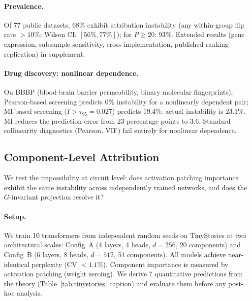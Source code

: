 \documentclass{article}
\begin{document}
\paragraph{Prevalence.}
Of 77 public datasets, 68\% exhibit attribution instability (any within-group flip rate $> 10\%$; Wilson CI: $[56\%, 77\%]$); for $P \geq 20$: 93\%. Extended results (gene expression, subsample sensitivity, cross-implementation, published ranking replication) in supplement.

\paragraph{Drug discovery: nonlinear dependence.}
On BBBP (blood-brain barrier permeability, binary molecular fingerprints), Pearson-based screening predicts $0\%$ instability for a nonlinearly dependent pair; MI-based screening ($I > \tau_{95} = 0.027$) predicts $19.4\%$; actual instability is $23.1\%$. MI reduces the prediction error from 23 percentage points to 3.6. Standard collinearity diagnostics (Pearson, VIF) fail entirely for nonlinear dependence.

\subsection{Component-Level Attribution}
\label{sec:component-experiments}

We test the impossibility at circuit level: does activation patching importance exhibit the same instability across independently trained networks, and does the $G$-invariant projection resolve it?

\paragraph{Setup.}
We train 10 transformers from independent random seeds on TinyStories \citep{eldan2023tinystories} at two architectural scales: Config~A (4 layers, 4 heads, $d{=}256$, 20 components) and Config~B (6 layers, 8 heads, $d{=}512$, 54 components). All models achieve near-identical perplexity (CV $< 1.1\%$). Component importance is measured by activation patching (weight zeroing). We derive 7 quantitative predictions from the theory (Table~\ref{tab:tinystories} caption) and evaluate them before any post-hoc analysis.
\end{document}
